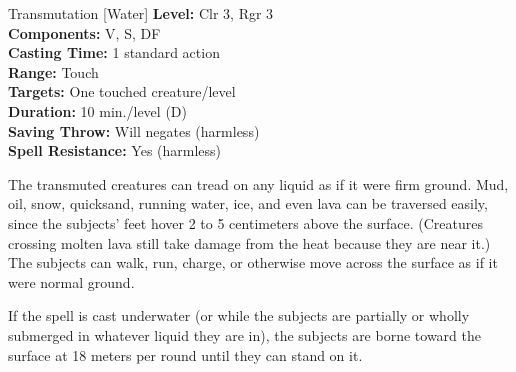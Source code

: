{Transmutation [Water]}
{
	\textbf{Level:}
	Clr 3, Rgr 3\\
	\textbf{Components:}
	V, S, DF\\
	\textbf{Casting Time:}
	1 standard action\\
	\textbf{Range:}
	Touch\\
	\textbf{Targets:}
	One touched creature/level\\
	\textbf{Duration:}
	10 min./level (D)\\
	\textbf{Saving Throw:}
	Will negates (harmless)\\
	\textbf{Spell Resistance:}
	Yes (harmless)\\
}
{
	The transmuted creatures can tread on any liquid as if it were firm ground. Mud, oil, snow, quicksand, running water, ice, and even lava can be traversed easily, since the subjects' feet hover 2 to 5 centimeters above the surface. (Creatures crossing molten lava still take damage from the heat because they are near it.) The subjects can walk, run, charge, or otherwise move across the surface as if it were normal ground.

	If the spell is cast underwater (or while the subjects are partially or wholly submerged in whatever liquid they are in), the subjects are borne toward the surface at 18 meters per round until they can stand on it.

}
